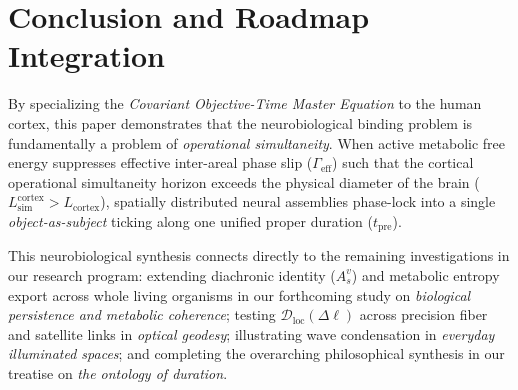 \documentclass[11pt,a4paper]{article}
\begin{document}
\section{Conclusion and Roadmap Integration}
By specializing the \emph{Covariant Objective-Time Master Equation} to the human cortex, this paper demonstrates that the neurobiological binding problem is fundamentally a problem of \emph{operational simultaneity}. When active metabolic free energy suppresses effective inter-areal phase slip ($\Gamma_{\mathrm{eff}}$) such that the cortical operational simultaneity horizon exceeds the physical diameter of the brain ($L_{\mathrm{sim}}^{\mathrm{cortex}} > L_{\mathrm{cortex}}$), spatially distributed neural assemblies phase-lock into a single \emph{object-as-subject} ticking along one unified proper duration ($t_{\mathrm{pre}}$).

This neurobiological synthesis connects directly to the remaining investigations in our research program: extending diachronic identity ($A_s^v$) and metabolic entropy export across whole living organisms in our forthcoming study on \emph{biological persistence and metabolic coherence}; testing $\mathcal{D}_{\mathrm{loc}}(\Delta\ell)$ across precision fiber and satellite links in \emph{optical geodesy}; illustrating wave condensation in \emph{everyday illuminated spaces}; and completing the overarching philosophical synthesis in our treatise on \emph{the ontology of duration}.
\end{document}
